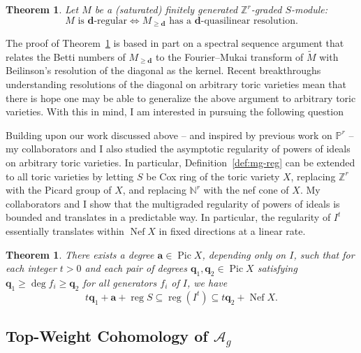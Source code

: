 \documentclass[11pt,reqno]{amsart}
\newtheorem{theorem}[lemma]{Theorem}
\theoremstyle{remark}
\newcommand{\reg}{\operatorname{reg}}
\newcommand{\Pic}{\operatorname{Pic}}
\newcommand{\Nef}{\operatorname{Nef}}
\renewcommand{\aa}{\mathbf{a}}
\newcommand{\dd}{\mathbf{d}}
\newcommand{\qq}{\mathbf{q}}
\newcommand{\NN}{\mathbb{N}}
\newcommand{\PP}{\mathbb{P}}
\newcommand{\ZZ}{\mathbb{Z}}
\begin{document}
\begin{theorem}\cite[Theorem A]{bruceHellerSayrafi21}\label{thm:mgreg-main}
Let $M$ be a (saturated) finitely generated $\ZZ^{r}$-graded $S$-module:
\[
\text{$M$ is $\dd$-regular} \iff  \text{$M_{\geq\dd}$ has a $\dd$-quasilinear resolution}.
\]
\end{theorem}

The proof of Theorem~\ref{thm:mgreg-main} is based in part on a spectral sequence argument that relates the Betti numbers of $M_{\geq\dd}$ to the Fourier--Mukai transform of $\widetilde{M}$ with Beilinson's resolution of the diagonal as the kernel.  Recent breakthroughs \cite{HHL23, brownErman23-2} understanding resolutions of the diagonal on arbitrary toric varieties mean that there is hope one may be able to generalize the above argument to arbitrary toric varieties. With this in mind, I am interested in pursuing the following question

Building upon our work discussed above -- and inspired by previous work on $\PP^{r}$ \cite{BEL91,CHT99,Kodiyalam00} -- my collaborators and I also studied the asymptotic regularity of powers of ideals on arbitrary toric varieties. In particular, Definition~\ref{def:mg-reg} can be extended to all toric varieties by letting $S$ be Cox ring of the toric variety $X$, replacing $\ZZ^r$ with the Picard group of $X$, and replacing $\NN^{r}$ with the nef cone of $X$. My collaborators and I show that the multigraded regularity of powers of ideals is bounded and translates in a predictable way. In particular, the regularity of $I^{t}$ essentially translates within $\Nef X$ in fixed directions at a linear rate.
 

\begin{theorem}\cite[Theorem 4.1]{bruceHellerSayrafi22}
  There exists a degree $\aa\in\Pic X$, depending only on $I$, such that for each integer $t>0$ and each pair of degrees $\qq_1,\qq_2\in\Pic X$ satisfying $\qq_1\geq\deg f_i\geq\qq_2$ for all generators $f_i$ of $I$, we have
	\[ t\qq_1+\aa+\reg S \subseteq \reg\!\left(I^t\right) \subseteq t\qq_2+\Nef X. \]
\end{theorem}

\subsection{Top-Weight Cohomology of $\mathcal{A}_{g}$}\label{subsec:prior:cohomology-of-ag}
\end{document}
